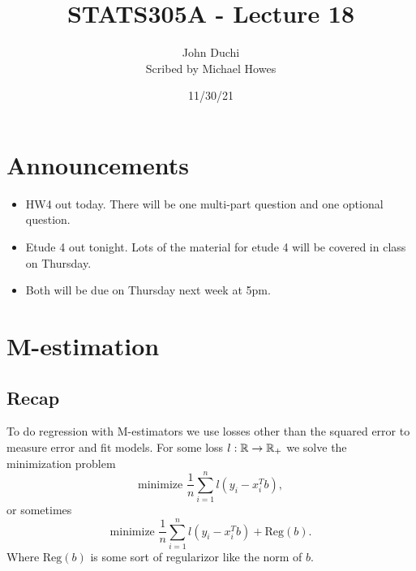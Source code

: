 

\DeclareMathOperator{\med}{med}
\DeclareMathOperator{\sgn}{sgn}

\title{STATS305A - Lecture 18}
\author{John Duchi\\ Scribed by Michael Howes}
\date{11/30/21}

\pagestyle{fancy}
\fancyhf{}


\maketitle
\tableofcontents
\section{Announcements}
\begin{itemize}
    \item HW4 out today. There will be one multi-part question and one optional question.
    \item Etude 4 out tonight. Lots of the material for etude 4 will be covered in class on Thursday.
    \item Both will be due on Thursday next week at 5pm.
\end{itemize}
\section{M-estimation}
\subsection{Recap}
To do regression with M-estimators we use losses other than the squared error to measure error and fit models. For some loss $l:{\mathbb R}\to {\mathbb R}_+$ we solve the minimization problem
\[\text{minimize } \frac{1}{n}\sum_{i=1}^n l(y_i-x_i^Tb), \]
or sometimes
\[\text{minimize } \frac{1}{n}\sum_{i=1}^n l(y_i-x_i^Tb) + \text{Reg}(b). \]
Where $\text{Reg}(b)$ is some sort of regularizor like the norm of $b$. 

